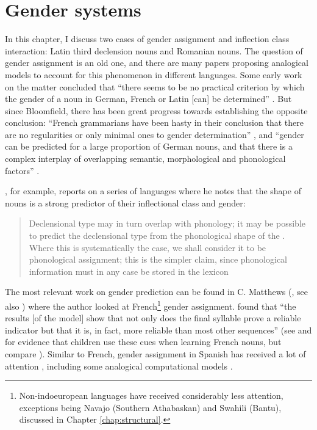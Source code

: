 \chapter{Gender systems}\label{chap:gender-assignment}


In this chapter, I discuss two cases of gender assignment and inflection class interaction: Latin third declension nouns and Romanian nouns. The question of gender assignment is an old one, and there are many papers proposing analogical models to account for this phenomenon in different languages. Some early work on the matter concluded that ``there seems to be no practical criterion by which the gender of a noun in German, French or Latin [can] be determined'' \autocite[280]{Bloomfield.1933a}. But since Bloomfield, there has been great progress towards establishing the opposite conclusion: ``French  grammarians  have  been  hasty  in  their  conclusion  that there are no regularities or only minimal ones to gender determination'' \autocite[316]{Tucker.1968}, and ``gender can be predicted for a large proportion of German nouns, and that there is a complex interplay of overlapping semantic, morphological and phonological factors'' \autocite[49]{Corbett.1991}.

\textcite{Corbett.1991}, for example, reports on a series of languages where he notes that the shape of nouns is a strong predictor of their inflectional class and gender:

\begin{quotation}
Declensional type may in turn overlap with phonology; it may be possible to predict the declensional type from the phonological shape of the . Where this is systematically the case, we shall consider it to be phonological assignment; this is the simpler claim, since phonological information must in any case be stored in the lexicon \autocite[34]{Corbett.1991}
\end{quotation}

The most relevant work on gender prediction can be found in C. Matthews (, see also \citealt{Lyster.2006}) where the author looked at French\footnote{Non-indoeuropean languages have received considerably less attention, exceptions being Navajo (Southern Athabaskan) \autocites{Eddington.2006, McDonough.2013} and Swahili (Bantu), discussed in Chapter \ref{chap:structural}.} gender assignment. \textcite[879]{Matthews.2010} found that ``the results [of the model] show that not only does the final syllable prove a reliable indicator but that it is, in fact, more reliable than most other sequences'' (see \textcite{Marchal.2007} and \textcite{Seigneuric.2007} for evidence that children use these cues when learning French nouns, but compare \textcite{Boloh.2010}). Similar to French, gender assignment in Spanish has received a lot of attention \autocite{Morin.2006, Sanchez.1995, Smead.2000}, including some analogical computational models \autocite{Eddington.2002}.

